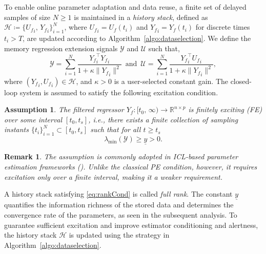 \documentclass[conference]{ieeeconf}
\newtheorem{assumption}{Assumption}
\newtheorem{remark}{Remark}
\begin{document}
To enable online parameter adaptation and data reuse, a finite set of delayed samples of size $N \ge 1$ is maintained in a \emph{history stack}, defined as $\mathcal{H} \coloneqq \big\{ {U_f}_i,\, {Y_f}_i \big\}_{i=1}^{N}$, where ${U_f}_i = U_f(t_i)$ and ${Y_f}_i = Y_f(t_i)$ for discrete times $t_i > T$, are updated according to Algorithm~\ref{algo:dataselection}.
We define the memory regression extension signals $\mathcal{Y}$ and $\mathcal{U}$ such that,
\begin{equation}\label{eq:YU}
    \mathcal{Y} = \sum_{i=1}^N \frac{{Y_f}_i^\top {Y_f}_i}{1+\kappa \lVert {Y_f}_i \rVert^2} \,
    \text{ and } \,
    \mathcal{U} = \sum_{i=1}^N \frac{{Y_f}_i^\top {U_f}_i}{1+\kappa \lVert {Y_f}_i \rVert^2},
\end{equation}
where $\left({Y_f}_i, {U_f}_i\right) \in \mathcal H$, and $\kappa>0$ is a user-selected constant gain. The closed-loop system is assumed to satisfy the following excitation condition.

\begin{assumption}\label{ass:fullRank}
The filtered regressor $Y_f:[t_0, \, \infty)\to\mathbb{R}^{n\times p}$ is \emph{finitely exciting} (FE) over some interval $[t_0, t_{s}]$, i.e., there exists a finite collection of sampling instants $\{t_i\}_{i=1}^{N} \subset [t_{0}, t_{s}]$ such that for all $t \geq t_{s}$
\begin{equation}\label{eq:rankCond}
    \lambda_{\min}(\mathcal{Y})
    \ge \underline{y} > 0.
\end{equation}
\end{assumption}
\begin{remark}
The assumption is commonly adopted in ICL-based parameter estimation frameworks (\cite{SCC.Chowdhary.Johnson2010, SCC.Parikh.Kamalapurkar.ea2019,  SCC.Ogri.Bell.ea2023, SCC.Satharasi.Ogri.ea2026}). Unlike the classical PE condition, however, it requires excitation only over a finite interval, making it a weaker requirement.
\end{remark}

A history stack satisfying \eqref{eq:rankCond} is called \emph{full rank}. The constant $\underline{y}$ quantifies the information richness of the stored data and determines the convergence rate of the parameters, as seen in the subsequent analysis. To guarantee sufficient excitation and improve estimator conditioning and alertness, the history stack $\mathcal{H}$ is updated using the strategy in Algorithm~\ref{algo:dataselection}. 
\end{document}
